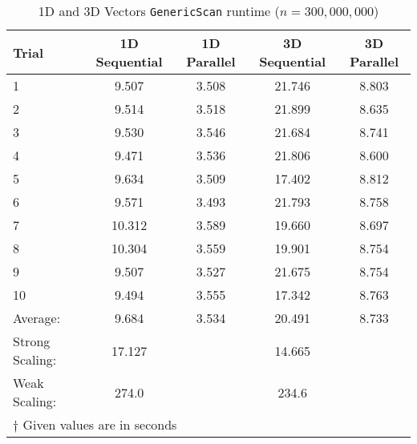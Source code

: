 \documentclass[addpoints]{exam}
\begin{document}
\begin{questions}
\begin{solution}
\begin{table}[H]
\centering
\caption{1D and 3D Vectors {\tt GenericScan} runtime ($n=300,000,000$)}
\begin{tabular}{l | c c c c }
\hline\hline
Trial & 1D Sequential & 1D Parallel & 3D Sequential & 3D Parallel\\
\hline
1 & \phantom{1}9.507 & 3.508 & 21.746 & 8.803\\
2 & \phantom{1}9.514 & 3.518 & 21.899 & 8.635\\
3 & \phantom{1}9.530 & 3.546 & 21.684 & 8.741\\
4 & \phantom{1}9.471 & 3.536 & 21.806 & 8.600\\
5 & \phantom{1}9.634 & 3.509 & 17.402 & 8.812\\
6 & \phantom{1}9.571 & 3.493 & 21.793 & 8.758\\
7 & 10.312 & 3.589 & 19.660 & 8.697\\
8 & 10.304 & 3.559 & 19.901 & 8.754\\
9 & \phantom{1}9.507 & 3.527 & 21.675 & 8.754\\
10 & \phantom{1}9.494 & 3.555 & 17.342 & 8.763\\
\hline
Average: & 9.684 & 3.534 & 20.491 & 8.733\\
\hline
Strong Scaling: & 17.127 & & 14.665\\
Weak Scaling: & 274.0 & & 234.6\\
\hline\hline
\multicolumn{5}{l}{{\scriptsize $\dagger$ Given values are in seconds}}
\end{tabular}
\label{table:300m_scan}
\end{table}



\end{solution}
\end{questions}
\end{document}
